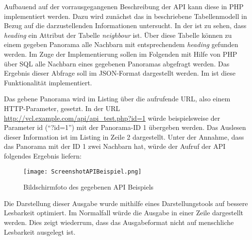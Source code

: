 
Aufbauend auf der vorrausgegangenen Beschreibung der API kann diese in PHP
implementiert werden. Dazu wird zunächst das in 
beschriebene Tabellenmodell in Bezug auf die darzustellenden Informationen
untersucht. In der  ist zu sehen, dass
\textit{heading} ein Attribut der Tabelle \textit{neighbour} ist. Über diese
Tabelle können zu einem gegeben Panorama alle Nachbarn mit entsprechendem
\textit{heading} gefunden werden.
Im Zuge der Implementierung sollen im Folgenden mit Hilfe von PHP über SQL alle
Nachbarn eines gegebenen Panoramas abgefragt werden. Das Ergebnis dieser
Abfrage soll im JSON-Format dargestellt werden. Im 
ist diese Funktionalität implementiert.

\clearpage



Das gebene Panorama wird im Listing über die aufrufende URL, also einem
HTTP\footnotemark -Parameter, gesetzt. In der URL
\url{http://vcl.example.com/api/api\_test.php?id=1} würde beispielsweise der
Parameter id ("`?id=1"') mit der Panorama-ID 1 übergeben werden. Das
Auslesen dieser Information ist im Listing in Zeile 2 dargestellt.
Unter der Annahme, dass das Panorama mit der ID 1 zwei Nachbarn hat, würde der
Aufruf der API folgendes Ergebnis liefern:


\begin{figure}[htb]
\centering
\texttt{[image: ScreenshotAPIBeispiel.png]}
\caption[API Beispiel]{Bildschirmfoto des gegebenen API Beispiels}
\label{fig:ScreenshotAPIBeispiel}
\end{figure}

Die Darstellung dieser Ausgabe wurde mithilfe eines Darstellungstools auf
bessere Lesbarkeit optimiert. Im Normalfall würde die Ausgabe in einer Zeile
dargestellt werden. Dies zeigt wiederrum, dass das Ausgabeformat nicht auf
menschliche Lesbarkeit ausgelegt ist.

